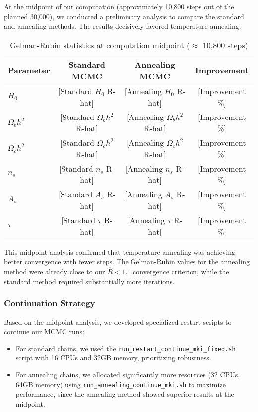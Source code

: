 \documentclass[11pt]{article}
\theoremstyle{definition}
\begin{document}
At the midpoint of our computation (approximately 10,800 steps out of the planned 30,000), we conducted a preliminary analysis to compare the standard and annealing methods. The results decisively favored temperature annealing:

\begin{table}[h!]
  \centering
  \small
  \caption{Gelman-Rubin statistics at computation midpoint ($\approx$ 10,800 steps)}
  \label{tab:midpoint-rhat}
  \begin{tabular}{l c c c}
    \toprule
    \textbf{Parameter} & \textbf{Standard MCMC} & \textbf{Annealing MCMC} & \textbf{Improvement} \\
    \midrule
    $H_0$ & [Standard $H_0$ R-hat] & [Annealing $H_0$ R-hat] & [Improvement \%] \\
    $\Omega_b h^2$ & [Standard $\Omega_b h^2$ R-hat] & [Annealing $\Omega_b h^2$ R-hat] & [Improvement \%] \\
    $\Omega_c h^2$ & [Standard $\Omega_c h^2$ R-hat] & [Annealing $\Omega_c h^2$ R-hat] & [Improvement \%] \\
    $n_s$ & [Standard $n_s$ R-hat] & [Annealing $n_s$ R-hat] & [Improvement \%] \\
    $A_s$ & [Standard $A_s$ R-hat] & [Annealing $A_s$ R-hat] & [Improvement \%] \\
    $\tau$ & [Standard $\tau$ R-hat] & [Annealing $\tau$ R-hat] & [Improvement \%] \\
    \bottomrule
  \end{tabular}
\end{table}

\noindent This midpoint analysis confirmed that temperature annealing was achieving better convergence with fewer steps. The Gelman-Rubin values for the annealing method were already close to our $\hat{R} < 1.1$ convergence criterion, while the standard method required substantially more iterations.

\subsubsection{Continuation Strategy}

Based on the midpoint analysis, we developed specialized restart scripts to continue our MCMC runs:

\begin{itemize}
  \item For standard chains, we used the \texttt{run\_restart\_continue\_mki\_fixed.sh} script with 16 CPUs and 32GB memory, prioritizing robustness.
  
  \item For annealing chains, we allocated significantly more resources (32 CPUs, 64GB memory) using \texttt{run\_annealing\_continue\_mki.sh} to maximize performance, since the annealing method showed superior results at the midpoint.
\end{itemize}
\end{document}
